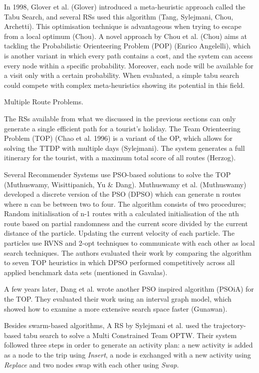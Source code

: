 In 1998, Glover et al. (Glover) introduced a meta-heuristic approach called the
Tabu Search, and several RSs used this algorithm (Tang, Sylejmani, Chou,
Archetti). This optimisation technique is advantageous when trying to escape
from a local optimum (Chou). A novel approach by Chou et al. (Chou) aims at
tackling the Probabilistic Orienteering Problem (POP) (Enrico Angelelli), which
is another variant in which every path contains a cost, and the system can
access every node within a specific probability. Moreover, each node will be
available for a visit only with a certain probability. When evaluated, a simple
tabu search could compete with complex meta-heuristics showing its potential in
this field.



Multiple Route Problems.

The RSs available from what we discussed in the previous sections can only
generate a single efficient path for a tourist's holiday. The Team Orienteering
Problem (TOP) (Chao et al. 1996) is a variant of the OP, which allows for
solving the TTDP with multiple days (Sylejmani). The system generates a full
itinerary for the tourist, with a maximum total score of all routes (Herzog). 

Several Recommender Systems use PSO-based solutions to solve the TOP
(Muthuswamy, Wisittipanich, Yu \& Dang). Muthuswamy et al. (Muthuswamy)
developed a discrete version of the PSO (DPSO) which can generate n routes
where n can be between two to four. The algorithm consists of two procedures;
Random initialisation of n-1 routes with a calculated initialisation of the nth
route based on partial randomness and the current score divided by the current
distance of the particle.  Updating the current velocity of each particle.  The
particles use RVNS and 2-opt techniques to communicate with each other as local
search techniques. The authors evaluated their work by comparing the algorithm
to seven TOP heuristics in which DPSO performed competitively across all
applied benchmark data sets (mentioned in Gavalas). 

A few years later, Dang et al. wrote another PSO inspired algorithm (PSOiA) for
the TOP. They evaluated their work using an interval graph model, which showed
how to examine a more extensive search space faster (Gunawan).

Besides swarm-based algorithms, A RS by Sylejmani et al. \cite{Sylejmani2012}
used the trajectory-based tabu search to solve a Multi Constrained Team OPTW.
Their system followed three steps in order to generate an activity plan: a new
activity is added as a node to the trip using \emph{Insert}, a node is
exchanged with a new activity using \emph{Replace} and two nodes swap with each
other using \emph{Swap}. 

